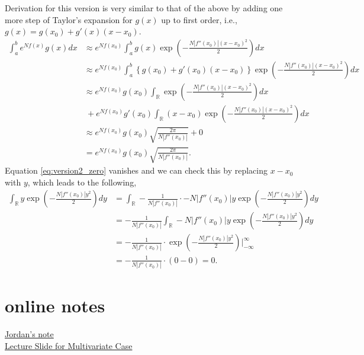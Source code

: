 \documentclass[fontsize=12pt]{article}
\begin{document}
Derivation for this version is very similar to that of the above by adding one more step of Taylor's expansion for $g(x)$ up to first order, i.e., $g(x) = g(x_0) + g'(x)(x-x_0)$.
\begin{align}
\int_a^b e^{N f(x)} g(x) dx & \approx e^{N f(x_0)} \int_{a}^b g(x) \exp \left(- \frac{N |f''(x_0)| (x-x_0)^2}{2}  \right) dx \nonumber \\
& \approx e^{N f(x_0)} \int_{a}^b \left\lbrace g(x_0) + g'(x_0)(x-x_0) \right\rbrace \exp \left(- \frac{N |f''(x_0)| (x-x_0)^2}{2}  \right) dx \nonumber \\
&\approx e^{N f(x_0)} g(x_0) \int_\mathbb{R} \exp \left(- \frac{N |f''(x_0)| (x-x_0)^2}{2}  \right) dx \nonumber \\
&~ + e^{N f(x_0)} g'(x_0) \int_\mathbb{R} (x-x_0) \exp \left(- \frac{N |f''(x_0)| (x-x_0)^2}{2}  \right) dx \label{eq:version2_zero} \\
&\approx e^{N f(x_0)} g(x_0) \sqrt{\frac{2\pi}{N |f''(x_0)|}} + 0 \nonumber \\
&= e^{N f(x_0)} g(x_0) \sqrt{\frac{2\pi}{N |f''(x_0)|}}. \nonumber
\end{align}
Equation \eqref{eq:version2_zero} vanishes and we can check this by replacing $x-x_0$ with $y$, which leads to the following,
\begin{align*}
\int_{\mathbb{R}} y \exp \left( -\frac{N|f''(x_0)| y^2}{2} \right) dy
&= \int_{\mathbb{R}} -\frac{1}{N |f''(x_0)|}\cdot - N |f''(x_0)| y \exp \left( -\frac{N|f''(x_0)| y^2}{2} \right) dy \\ 
&= -\frac{1}{N |f''(x_0)|} \int_{\mathbb{R}} - N |f''(x_0)| y \exp \left( -\frac{N|f''(x_0)| y^2}{2} \right) dy \\
&= -\frac{1}{N |f''(x_0)|} \cdot  \exp \left( -\frac{N|f''(x_0)| y^2}{2} \right) \bigg\rvert_{-\infty}^{\infty} \\
&= -\frac{1}{N |f''(x_0)|} \cdot (0 - 0) = 0. 
\end{align*}

\section{online notes}
\href{https://people.eecs.berkeley.edu/~jordan/courses/260-spring10/lectures/lecture16.pdf}{Jordan's note}\\
\href{http://www.stats.ox.ac.uk/~steffen/teaching/bs2HT9/laplace.pdf}{Lecture Slide for Multivariate Case}



\end{document}

